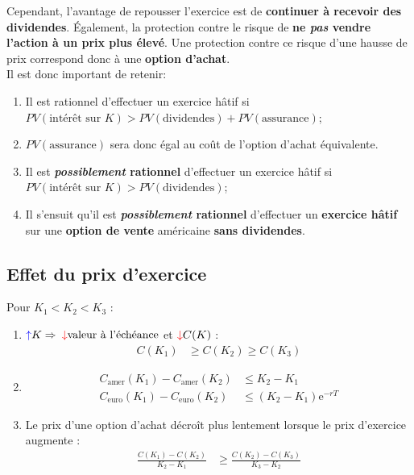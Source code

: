 \documentclass[10pt, french]{article}
\begin{document}
\begin{multicols*}{2}
Cependant, l'avantage de repousser l'exercice est de \textbf{continuer à recevoir des dividendes}. Également, la protection contre le risque de \textbf{ne \textit{pas} vendre l'action à un prix plus élevé}. Une protection contre ce risque d'une hausse de prix correspond donc à une \textbf{option d'achat}.\\

Il est donc important de retenir:
\begin{conceptgen}{}
\begin{enumerate}
	\item	Il est rationnel d'effectuer un exercice hâtif si\\
	 $PV(\text{intérêt sur $K$}) > PV(\text{dividendes}) + PV(\text{assurance})$;
 	\item[]	$PV(\text{assurance})$ sera donc égal au coût de l'option d'achat équivalente.
	\item	Il est \textbf{\textit{possiblement} rationnel} d'effectuer un exercice hâtif si \\
	$PV(\text{intérêt sur $K$}) > PV(\text{dividendes})$;
	\item	Il s'ensuit qu'il est \textbf{\textit{possiblement} rationnel} d'effectuer un \textbf{exercice hâtif} sur une \textbf{option de vente} américaine \textbf{sans dividendes}.
\end{enumerate}
\end{conceptgen}


\columnbreak
\subsection{Effet du prix d'exercice}
\begin{definitionNOHFILLsub}
Pour $K_{1}	<	K_{2}	<	K_{3}$ :
\begin{enumerate}
	\item	${\color{blue}\uparrow} K \Rightarrow$ ${\color{red}\downarrow} \text{valeur à l'échéance}$ et ${\color{red}\downarrow} C(K)$ :
			\begin{align*}
			C(K_{1})	&\geq	C(K_{2}) \geq	C(K_{3})
			\end{align*}
	\item	\begin{align*}
			C_{\text{amer}}(K_{1}) - C_{\text{amer}}(K_{2}) &\leq K_{2} - K_{1}	\\
			C_{\text{euro}}(K_{1}) - C_{\text{euro}}(K_{2}) &\leq (K_{2} - K_{1})\textrm{e}^{-rT}
			\end{align*}
	\item	Le prix d'une option d'achat décroît plus lentement lorsque le prix d'exercice augmente :
			\begin{align*}
			\frac{C(K_{1}) - C(K_{2})}{K_{2} - K_{1}}
			&\geq	
			\frac{C(K_{2}) - C(K_{3})}{K_{3} - K_{2}}	
			\end{align*}
\end{enumerate}
\end{definitionNOHFILLsub}


\end{multicols*}
\end{document}
